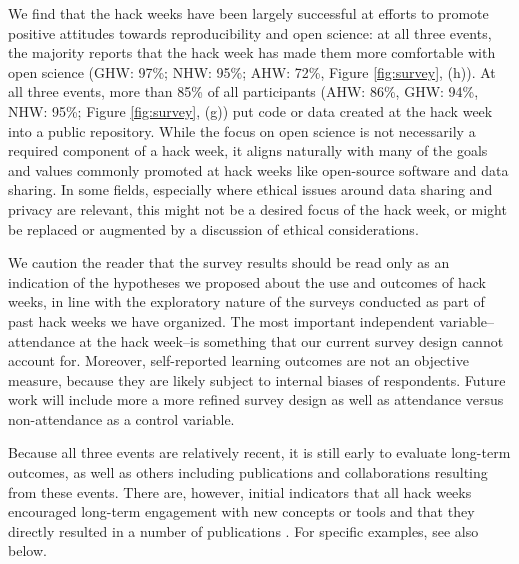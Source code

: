 We find that the hack weeks have been largely successful at efforts to promote positive attitudes towards reproducibility and open science: at all three events, the majority reports that the hack week has made them more comfortable with open science  (GHW: 97\%; NHW: 95\%; AHW: 72\%, Figure \ref{fig:survey}, (h)). At all three events, more than 85\% of all participants (AHW: 86\%, GHW: 94\%, NHW: 95\%; Figure \ref{fig:survey}, (g)) put code or data created at the hack week into a public repository.
While the focus on open science is not necessarily a required component of a hack week, it aligns naturally with many of the goals and values commonly promoted at hack weeks like open-source software and data sharing. In some fields, especially where ethical issues around data sharing and privacy are relevant, this might not be a desired focus of the hack week, or might be replaced or augmented by a discussion of ethical considerations.

We caution the reader that the survey results should be read only as an indication of the hypotheses we proposed about the use and outcomes of hack weeks, in line with the exploratory nature of the surveys conducted as part of past hack weeks we have organized. The most important independent variable--attendance at the hack week--is something that our current survey design cannot account for. Moreover, self-reported learning outcomes are not an objective measure, because they are likely subject to internal biases of respondents. Future work will include more a more refined survey design as well as attendance versus non-attendance as a control variable.

Because all three events are relatively recent, it is still early to evaluate long-term outcomes, as well as others including publications and collaborations resulting from these events.
There are, however, initial indicators that all hack weeks encouraged long-term engagement with new concepts or tools and that they directly resulted in a number of publications \cite{gullysantiago2015,faria2016,keshavan2017,leonard2017,jordan2017,peterson2017,hahn2017,pricewhelan2017}. For specific examples, see also below.

